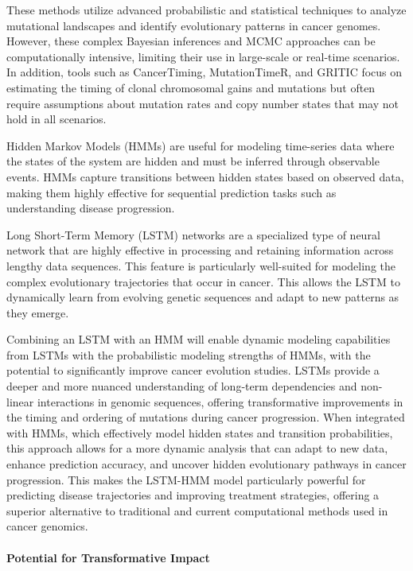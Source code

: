 These methods utilize advanced probabilistic and statistical techniques to analyze mutational landscapes 
and identify evolutionary patterns in cancer genomes.
However, these complex Bayesian inferences and MCMC approaches can be computationally intensive, 
limiting their use in large-scale or real-time scenarios.
In addition, tools such as CancerTiming, MutationTimeR, and GRITIC focus on estimating the timing of clonal chromosomal gains and mutations 
but often require assumptions about mutation rates and copy number states that may not hold in all scenarios. 

Hidden Markov Models (HMMs) are useful for modeling time-series data where the states of the system are hidden 
and must be inferred through observable events. 
HMMs capture transitions between hidden states based on observed data, 
making them highly effective for sequential prediction tasks such as understanding disease progression.

Long Short-Term Memory (LSTM) networks are a specialized type of neural network that are 
highly effective in processing and retaining information across lengthy data sequences.
This feature is particularly well-suited for modeling the complex evolutionary trajectories that occur in cancer. 
This allows the LSTM to dynamically learn from evolving genetic sequences and adapt to new patterns as they emerge.

Combining an LSTM with an HMM will enable dynamic modeling capabilities from LSTMs with the probabilistic modeling strengths of HMMs, 
with the potential to significantly improve cancer evolution studies. 
LSTMs provide a deeper and more nuanced understanding of long-term dependencies and non-linear interactions in genomic sequences, 
offering transformative improvements in the timing and ordering of mutations during cancer progression.
When integrated with HMMs, which effectively model hidden states and transition probabilities, 
this approach allows for a more dynamic analysis that can adapt to new data, enhance prediction accuracy, 
and uncover hidden evolutionary pathways in cancer progression. 
This makes the LSTM-HMM model particularly powerful for predicting disease trajectories and improving treatment strategies, 
offering a superior alternative to traditional and current computational methods used in cancer genomics.

\paragraph{Potential for Transformative Impact}

